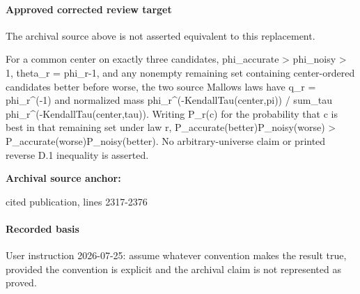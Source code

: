 \documentclass[10pt]{article}
\begin{document}
\paragraph{Approved corrected review target}
The archival source above is not asserted equivalent to this replacement.
\begin{ReviewVerbatim}
For a common center on exactly three candidates, phi_accurate > phi_noisy > 1, theta_r = phi_r-1, and any nonempty remaining set containing center-ordered candidates better before worse, the two source Mallows laws have q_r = phi_r^(-1) and normalized mass phi_r^(-KendallTau(center,pi)) / sum_tau phi_r^(-KendallTau(center,tau)). Writing P_r(c) for the probability that c is best in that remaining set under law r, P_accurate(better)P_noisy(worse) > P_accurate(worse)P_noisy(better). No arbitrary-universe claim or printed reverse D.1 inequality is asserted.
\end{ReviewVerbatim}

\textbf{Archival source anchor:} {\footnotesize\raggedright cited publication, lines 2317-\allowbreak{}2376\par}
\paragraph{Recorded basis}
User instruction 2026-\allowbreak{}07-\allowbreak{}25:\allowbreak{} assume whatever convention makes the result true, provided the convention is explicit and the archival claim is not represented as proved.\allowbreak{}
\end{document}
